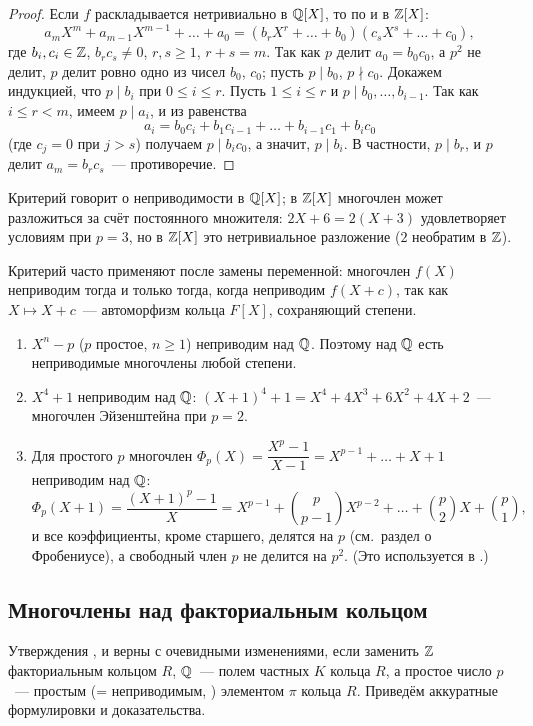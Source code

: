\begin{proof}
Если $f$ раскладывается нетривиально в $\mathbb Q[X]$, то по  и в $\mathbb Z[X]$:
\[
a_mX^m+a_{m-1}X^{m-1}+\dots+a_0=(b_rX^r+\dots+b_0)(c_sX^s+\dots+c_0),
\]
где $b_i,c_i\in\mathbb Z$, $b_rc_s\ne0$, $r,s\ge1$, $r+s=m$. Так как $p$ делит $a_0=b_0c_0$, а $p^2$ не делит, $p$ делит ровно одно из
чисел $b_0$, $c_0$; пусть $p\mid b_0$, $p\nmid c_0$. Докажем индукцией, что $p\mid b_i$ при $0\le i\le r$. Пусть
$1\le i\le r$ и $p\mid b_0,\dots,b_{i-1}$. Так как $i\le r<m$, имеем $p\mid a_i$, и из равенства
\[
a_i=b_0c_i+b_1c_{i-1}+\dots+b_{i-1}c_1+b_ic_0
\]
(где $c_j=0$ при $j>s$) получаем $p\mid b_ic_0$, а значит, $p\mid b_i$. В частности, $p\mid b_r$, и $p$ делит
$a_m=b_rc_s$~--- противоречие.
\end{proof}

\begin{remark}[1.16a]
Критерий говорит о неприводимости в $\mathbb Q[X]$; в $\mathbb Z[X]$ многочлен может разложиться за счёт постоянного множителя:
$2X+6=2(X+3)$ удовлетворяет условиям при $p=3$, но в $\mathbb Z[X]$ это нетривиальное разложение ($2$ необратим в $\mathbb Z$).

Критерий часто применяют после замены переменной: многочлен $f(X)$ неприводим тогда и только тогда, когда неприводим
$f(X+c)$, так как $X\mapsto X+c$~--- автоморфизм кольца $F[X]$, сохраняющий степени.
\begin{enumerate}[label=(\alph*)]
\item $X^n-p$ ($p$ простое, $n\ge1$) неприводим над $\mathbb Q$. Поэтому над $\mathbb Q$ есть неприводимые многочлены любой степени.
\item $X^4+1$ неприводим над $\mathbb Q$: $(X+1)^4+1=X^4+4X^3+6X^2+4X+2$~--- многочлен Эйзенштейна при $p=2$.
\item Для простого $p$ многочлен $\Phi_p(X)=\dfrac{X^p-1}{X-1}=X^{p-1}+\dots+X+1$ неприводим над $\mathbb Q$:
\[
\Phi_p(X+1)=\frac{(X+1)^p-1}X=X^{p-1}+\binom p{p-1}X^{p-2}+\dots+\binom p2X+\binom p1,
\]
и все коэффициенты, кроме старшего, делятся на $p$ (см.\ раздел о Фробениусе), а свободный член $p$ не делится на $p^2$. (Это используется в .)
\end{enumerate}
\end{remark}

\subsection*{Многочлены над факториальным кольцом}

Утверждения ,  и  верны с очевидными изменениями, если заменить $\mathbb Z$ факториальным
кольцом $R$, $\mathbb Q$~--- полем частных $K$ кольца $R$, а простое число $p$~--- простым (= неприводимым, )
элементом $\pi$ кольца $R$. Приведём
аккуратные формулировки и доказательства.

